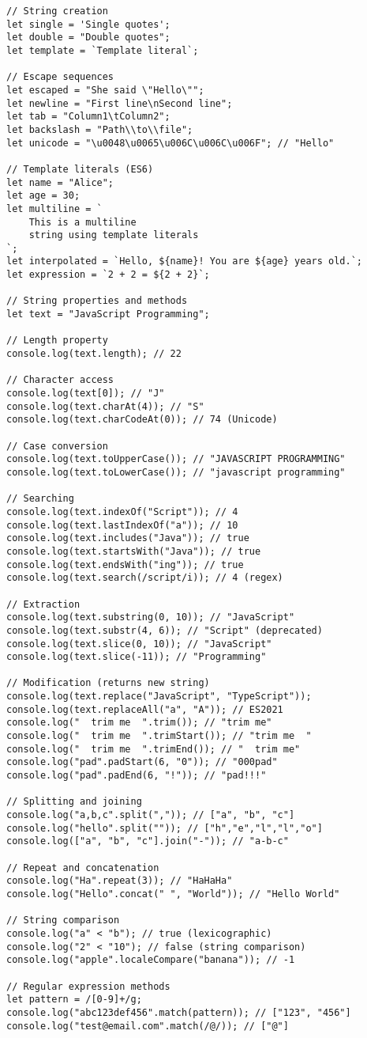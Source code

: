 \documentclass[12pt,a4paper,oneside]{book}
\begin{document}
\begin{lstlisting}[style=javascript, caption={\textbf{String Type - Complete Examples}}, label=lst:string-type]
// String creation
let single = 'Single quotes';
let double = "Double quotes";
let template = `Template literal`;

// Escape sequences
let escaped = "She said \"Hello\"";
let newline = "First line\nSecond line";
let tab = "Column1\tColumn2";
let backslash = "Path\\to\\file";
let unicode = "\u0048\u0065\u006C\u006C\u006F"; // "Hello"

// Template literals (ES6)
let name = "Alice";
let age = 30;
let multiline = `
    This is a multiline
    string using template literals
`;
let interpolated = `Hello, ${name}! You are ${age} years old.`;
let expression = `2 + 2 = ${2 + 2}`;

// String properties and methods
let text = "JavaScript Programming";

// Length property
console.log(text.length); // 22

// Character access
console.log(text[0]); // "J"
console.log(text.charAt(4)); // "S"
console.log(text.charCodeAt(0)); // 74 (Unicode)

// Case conversion
console.log(text.toUpperCase()); // "JAVASCRIPT PROGRAMMING"
console.log(text.toLowerCase()); // "javascript programming"

// Searching
console.log(text.indexOf("Script")); // 4
console.log(text.lastIndexOf("a")); // 10
console.log(text.includes("Java")); // true
console.log(text.startsWith("Java")); // true
console.log(text.endsWith("ing")); // true
console.log(text.search(/script/i)); // 4 (regex)

// Extraction
console.log(text.substring(0, 10)); // "JavaScript"
console.log(text.substr(4, 6)); // "Script" (deprecated)
console.log(text.slice(0, 10)); // "JavaScript"
console.log(text.slice(-11)); // "Programming"

// Modification (returns new string)
console.log(text.replace("JavaScript", "TypeScript"));
console.log(text.replaceAll("a", "A")); // ES2021
console.log("  trim me  ".trim()); // "trim me"
console.log("  trim me  ".trimStart()); // "trim me  "
console.log("  trim me  ".trimEnd()); // "  trim me"
console.log("pad".padStart(6, "0")); // "000pad"
console.log("pad".padEnd(6, "!")); // "pad!!!"

// Splitting and joining
console.log("a,b,c".split(",")); // ["a", "b", "c"]
console.log("hello".split("")); // ["h","e","l","l","o"]
console.log(["a", "b", "c"].join("-")); // "a-b-c"

// Repeat and concatenation
console.log("Ha".repeat(3)); // "HaHaHa"
console.log("Hello".concat(" ", "World")); // "Hello World"

// String comparison
console.log("a" < "b"); // true (lexicographic)
console.log("2" < "10"); // false (string comparison)
console.log("apple".localeCompare("banana")); // -1

// Regular expression methods
let pattern = /[0-9]+/g;
console.log("abc123def456".match(pattern)); // ["123", "456"]
console.log("test@email.com".match(/@/)); // ["@"]
\end{lstlisting}
\end{document}
